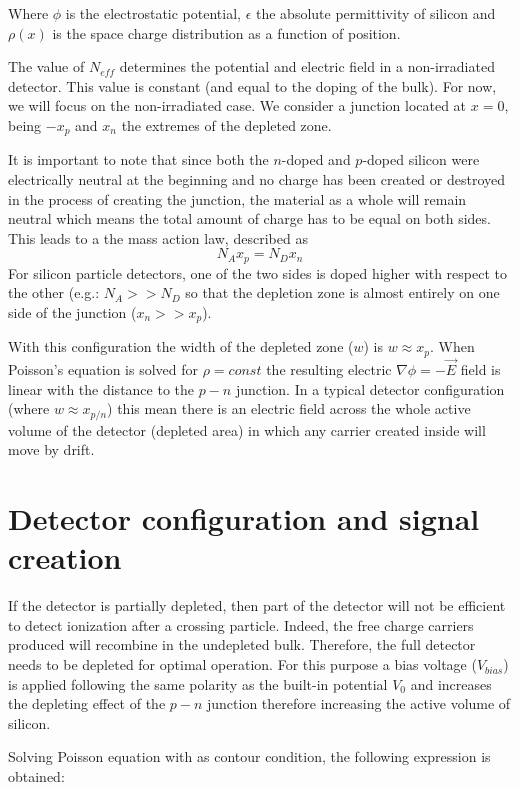 Where $\phi$ is the electrostatic potential, $\epsilon$ the absolute
permittivity of silicon and $\rho(x)$ is the space charge distribution as a
function of position.

The value of $N_{eff}$ determines the potential and electric field in a
non-irradiated detector. This value is constant (and equal to the doping of the
bulk). For now, we will focus on the non-irradiated case. We consider a junction
located at $x=0$, being $-x_p$ and $x_n$ the extremes of the depleted zone.

It is important to note that since both the $n$-doped and $p$-doped silicon were
electrically neutral at the beginning and no charge has been created or
destroyed in the process of creating the junction, the material as a whole will
remain neutral which means the total amount of charge has to be equal on both
sides. This leads to a the mass action law, described as \[N_A x_p = N_D x_n\] 
For silicon particle detectors, one of the two sides is doped higher with
respect to the other (e.g.: $N_A >> N_D$  so that the depletion zone is almost
entirely on one side of the junction ($x_n >> x_p$). 

With this configuration the width of the depleted zone ($w$) is $w \approx x_p$.
When Poisson's equation is solved for $\rho = const$ the resulting electric
$\nabla \phi = -\vec{E}$ field is linear with the distance to the $p-n$
junction. In a typical detector configuration (where $w \approx x_{p/n}$) this
mean there is an electric field across the whole active volume of the detector
(depleted area) in which any carrier created inside will move by drift. 


\section{Detector configuration and signal creation}

If the detector is partially depleted, then part of the detector will not be
efficient to detect ionization after a crossing particle. Indeed, the free
charge carriers produced will recombine in the undepleted bulk. Therefore, the
full detector needs to be depleted for optimal operation. For this purpose a
bias voltage ($V_{bias}$) is applied following the same polarity as the built-in
potential $V_0$ and increases the depleting effect of the $p-n$ junction
therefore increasing the active volume of silicon. 

Solving Poisson equation with \vias as contour condition, the following
expression is obtained: 

